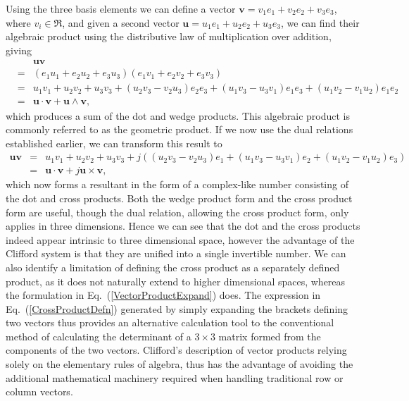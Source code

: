 \documentclass[prb,preprint]{revtex4}
\newcommand{\bea}{\begin{eqnarray}}
\newcommand{\eea}{\end{eqnarray}}
\newcommand{\iGA}{{j}}
\begin{document}
Using the three basis elements we can define a vector $ \boldsymbol{v} = v_1 e_1 + v_2 e_2 + v_3 e_3 $, where $ v_i \in \Re $, and given a second vector $ \boldsymbol{u} = u_1 e_1 + u_2 e_2 + u_3 e_3 $, we can find their algebraic product using the distributive law of multiplication over addition, giving
\bea \label{VectorProductExpand}
& & \boldsymbol{u} \boldsymbol{v} \\ \nonumber
& = & (e_1 u_1 + e_2 u_2 + e_3 u_3 ) ( e_1 v_1 + e_2 v_2 + e_3 v_3 ) \\ \nonumber
& = & u_1 v_1 + u_2 v_2 + u_3 v_3 + (u_2 v_3 - v_2 u_3 ) e_2 e_3 + (u_1 v_3 - u_3 v_1 ) e_1 e_3 + (u_1 v_2 - v_1 u_2 ) e_1 e_2 \\ \nonumber
& = & \boldsymbol{u} \cdot \boldsymbol{v}  + \boldsymbol{u} \wedge \boldsymbol{v}, \nonumber
\eea
which produces a sum of the dot and wedge products.  This algebraic product is commonly referred to as the geometric product.  If we now use the dual relations established earlier,  we can transform this result to
\bea \label{CrossProductDefn}
\boldsymbol{u} \boldsymbol{v} & = & u_1 v_1 + u_2 v_2 + u_3 v_3 + \iGA \left ((u_2 v_3 - v_2 u_3 ) e_1 + (u_1 v_3 - u_3 v_1 ) e_2 + (u_1 v_2 - v_1 u_2 ) e_3 \right ) \\ \nonumber
& = & \boldsymbol{u} \cdot \boldsymbol{v}  + \iGA \boldsymbol{u} \times \boldsymbol{v}, \nonumber
\eea
which now forms a resultant in the form of a complex-like number consisting of the dot and cross products.   Both the wedge product form and the cross product form are useful, though the dual relation, allowing the cross product form, only applies in  three dimensions.  Hence we can see that the dot and the cross products indeed appear intrinsic to three dimensional space, however the advantage of the Clifford system is that they are unified into a single invertible number.  We can also identify a limitation of defining the cross product as a separately defined product, as it does not naturally extend to higher dimensional spaces, whereas the formulation in Eq.~(\ref{VectorProductExpand}) does.  The expression in Eq.~(\ref{CrossProductDefn}) generated by simply expanding the brackets defining two vectors thus provides an alternative calculation tool to the conventional method of calculating the determinant of a $ 3 \times 3 $ matrix formed from the components of the two vectors.  Clifford's description of vector products relying solely on the elementary rules of algebra, thus has the advantage of avoiding the additional mathematical machinery required when handling traditional row or column vectors.
\end{document}
